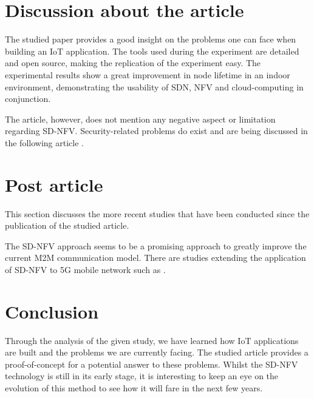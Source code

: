 \documentclass[10pt,journal,compsoc]{IEEEtran}
\begin{document}
\section{Discussion about the article}

The studied paper provides a good insight on the problems one can face 
when building an IoT application. The tools used during the experiment 
are detailed and open source, making the replication of the experiment 
easy. The experimental results show a great improvement in node lifetime 
in an indoor environment, demonstrating the usability of SDN, NFV and 
cloud-computing in conjunction.

The article, however, does not mention any negative aspect or limitation 
regarding SD-NFV. Security-related problems do exist and are being 
discussed in the following article \cite{deqing}.

\section{Post article}

This section discusses the more recent studies that have been conducted 
since the publication of the studied article.

The SD-NFV approach seems to be a promising approach to greatly improve 
the current M2M communication model. There are studies extending 
the application of SD-NFV to 5G mobile network such as \cite{5g}. 

\section{Conclusion}\label{sec:conclusion}

Through the analysis of the given study, we have learned how IoT 
applications are built and the problems we are currently facing. 
The studied article provides a proof-of-concept for a potential 
answer to these problems. Whilst the SD-NFV technology is still in its 
early stage, it is interesting to keep an eye on the evolution of 
this method to see how it will fare in the next few years.
\end{document}

